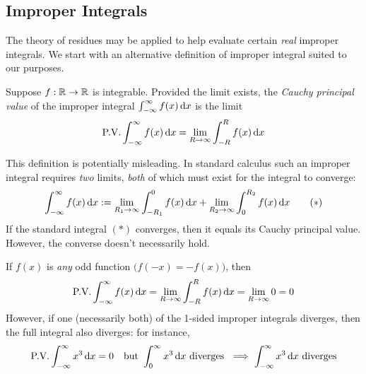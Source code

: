 \clearpage



\subsection{Improper Integrals}

The theory of residues may be applied to help evaluate certain \emph{real} improper integrals. We start with an alternative definition of improper integral suited to our purposes.

\begin{defn}{}{}
	Suppose $f:\mathbb{R}\to\mathbb{R}$ is integrable. Provided the limit exists, the \emph{Cauchy principal value} of the improper integral $\int_{-\infty}^\infty f(x)\,{\mathrm{d} x}$ is the limit
	\[
		\text{P.V.}\int_{-\infty}^\infty f(x)\,{\mathrm{d} x} 
		=\lim_{R\to\infty}\int_{-R}^R f(x)\,{\mathrm{d} x}
	\]
\end{defn}

This definition is potentially misleading. In standard calculus such an improper integral requires \emph{two} limits, \emph{both} of which must exist for the integral to converge:
\[
	\int_{-\infty}^\infty f(x)\,{\mathrm{d} x}
	:=\lim_{R_1\to\infty}\int_{-R_1}^0f(x)\,{\mathrm{d} x}
	+\lim_{R_2\to\infty}\int_0^{R_2}f(x)\,{\mathrm{d} x}
	\tag{$\ast$}
\]
If the standard integral $(\ast)$ converges, then it equals its Cauchy principal value. However, the converse doesn't necessarily hold.

\begin{example}{}{}
	If $f(x)$ is \emph{any} odd function $\bigl(f(-x)=-f(x)\bigr)$, then
	\[
		\text{P.V.}\int_{-\infty}^\infty f(x)\,{\mathrm{d} x} =\lim_{R\to\infty}\int_{-R}^R f(x)\,{\mathrm{d} x} =\lim_{R\to \infty}0=0
	\]
	However, if one (necessarily both) of the 1-sided improper integrals diverges, then the full integral also diverges: for instance,
	\[
		\text{P.V.}\int_{-\infty}^\infty x^3\,{\mathrm{d} x}=0\quad \text{but}\ \int_{0}^\infty x^3\,{\mathrm{d} x}\text{ diverges }\implies \int_{-\infty}^\infty x^3\,{\mathrm{d} x}\text{ diverges}
	\]
\end{example}

